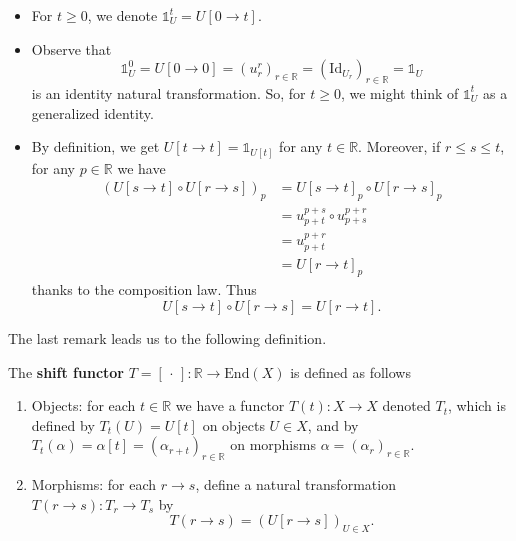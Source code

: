 \documentclass[11pt]{article}
\begin{document}
\begin{remark}\hfill\null
\begin{itemize}
\item For \(t\geq 0\), we denote 
$
\mathds{1}^{t}_U = U[0\to t]
$.

\item Observe that $$
\mathds{1}^{0}_U = U[0\to 0] = (u_r^r)_{r\in \mathbb{R}} 
= (\mathrm{Id}_{U_r})_{r\in \mathbb{R}}
=\mathds{1}_{U}
$$
is an identity natural transformation.
So, for \(t\geq 0\), we might think of \(\mathds{1}^{t}_U\)
as a generalized identity.

\item By definition, we get \(U[t\to t] = \mathds{1}_{U[t]}\) for any \(t\in \mathbb{R}\).
Moreover, if \(r\leq s\leq t\), for any \(p\in \mathbb{R}\) we have
\begin{align*}
\left( U[s\to t] \circ U[r\to s] \right)_p &= U[s\to t]_p \circ U[r\to s]_p\\
&= u_{p+t}^{p+s} \circ u_{p+s}^{p+r}\\
&= u_{p+t}^{p+r}\\
&= U[r\to t]_p
\end{align*}
thanks to the composition law. Thus 
$$
U[s\to t] \circ U[r\to s] = U[r\to t].
$$
\end{itemize}
\end{remark}




The last remark leads us to the following definition.

\begin{defi}
The \textbf{shift functor} \(T = [\,\cdot\,]\colon \mathbb{R}\to \mathrm{End}(X)\) 
is defined as follows
\begin{enumerate}[label=(\roman*)]
\item Objects: for each \(t\in \mathbb{R}\) we have a functor  \(T(t) \colon X\to X\) denoted  \(T_t\), which is defined by \(T_t( U) = U[t]\) on objects \(U\in X\), and by \(T_t(\alpha) = \alpha[t] = (\alpha_{r+t})_{r\in \mathbb{R}}\) on morphisms \(\alpha=(\alpha_r)_{r\in \mathbb{R}}\). %
\item Morphisms: for each \(r\to s\), define    a natural transformation $T(r\to s)\colon T_r\to T_s$ by
$$
T(r\to s) = \left( U[r\to s] \right)_{U\in X}.
$$
\end{enumerate}
\end{defi}
\end{document}

